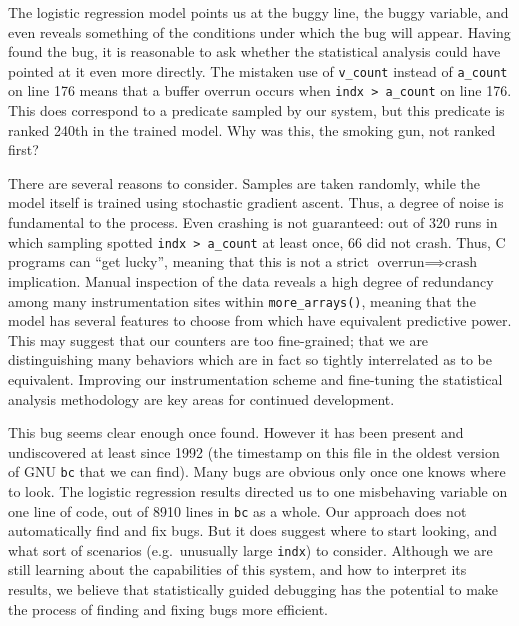 The logistic regression model points us at the buggy line, the buggy
variable, and even reveals something of the conditions under which the
bug will appear.  Having found the bug, it is reasonable to ask
whether the statistical analysis could have pointed at it even more
directly.  The mistaken use of \texttt{v\_count} instead of
\texttt{a\_count} on line 176 means that a buffer overrun occurs when
\texttt{indx > a\_count} on line 176.  This does correspond to a
predicate sampled by our system, but this predicate is ranked 240th in
the trained model.  Why was this, the smoking gun, not ranked first?

There are several reasons to consider.  Samples are taken randomly,
while the model itself is trained using stochastic gradient ascent.
Thus, a degree of noise is fundamental to the process.  Even crashing
is not guaranteed: out of 320 runs in which sampling spotted
\texttt{indx > a\_count} at least once, 66 did not crash.  Thus, C
programs can ``get lucky'', meaning that this is not a strict
$\text{overrun} \implies \text{crash}$ implication.  Manual inspection
of the data reveals a high degree of redundancy among many
instrumentation sites within \texttt{more\_arrays()}, meaning that the
model has several features to choose from which have equivalent
predictive power.  This may suggest that our counters are too
fine-grained; that we are distinguishing many behaviors which are in
fact so tightly interrelated as to be equivalent.  Improving our
instrumentation scheme and fine-tuning the statistical analysis
methodology are key areas for continued development.



This bug seems clear enough once found.  However it has been present
and undiscovered at least since 1992 (the time\-stamp on this file in
the oldest version of GNU \texttt{bc} that we can find).  Many bugs
are obvious only once one knows where to look.  The logistic
regression results directed us to one misbehaving variable on one line
of code, out of 8910 lines in \texttt{bc} as a whole.  Our approach
does not automatically find and fix bugs.  But it does suggest where
to start looking, and what sort of scenarios (e.g.\ unusually large
\texttt{indx}) to consider.  Although we are still learning about the
capabilities of this system, and how to interpret its results, we
believe that statistically guided debugging has the potential to make
the process of finding and fixing bugs more efficient.

